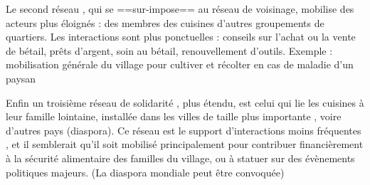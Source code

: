 Le second réseau , qui se ==sur-impose== au réseau de voisinage,  mobilise des acteurs plus éloignés : des  membres des cuisines d'autres groupements de quartiers. 
Les interactions sont plus ponctuelles : conseils sur l'achat ou la vente de bétail, prêts d'argent, soin au bétail, renouvellement d'outils. Exemple : mobilisation générale du village pour cultiver et récolter en cas de maladie d'un paysan 


Enfin un troisième réseau de solidarité , plus étendu, est celui qui lie les cuisines à leur famille lointaine, installée dans les villes  de taille plus importante , voire d'autres pays (diaspora).
Ce réseau est le support d'interactions  moins fréquentes , et il semblerait qu'il soit mobilisé principalement pour contribuer financièrement à la sécurité alimentaire des familles du village, ou à statuer sur des évènements politiques majeurs. (La diaspora mondiale peut être convoquée)

